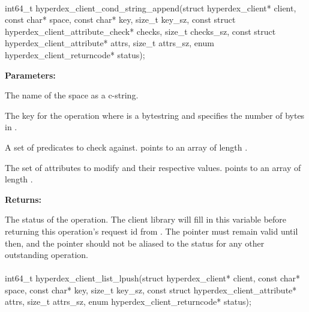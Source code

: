 \paragraph{}
\label{api:c:cond_string_append}
\begin{ccode}
int64_t hyperdex_client_cond_string_append(struct hyperdex_client* client,
        const char* space,
        const char* key, size_t key_sz,
        const struct hyperdex_client_attribute_check* checks, size_t checks_sz,
        const struct hyperdex_client_attribute* attrs, size_t attrs_sz,
        enum hyperdex_client_returncode* status);
\end{ccode}
\funcdesc 

\noindent\textbf{Parameters:}
\begin{description}[labelindent=\widthof{{\code{checks}, \code{checks\_sz}}},leftmargin=*,noitemsep,nolistsep,align=right]
\item[\code{space}] The name of the space as a c-string.
\item[\code{key}, \code{key\_sz}] The key for the operation where  is a bytestring and  specifies the number of bytes in .
\item[\code{checks}, \code{checks\_sz}] A set of predicates to check against.   points to an array of length .
\item[\code{attrs}, \code{attrs\_sz}] The set of attributes to modify and their respective values.   points to an array of length .
\end{description}

\noindent\textbf{Returns:}
\begin{description}[labelindent=\widthof{{\code{status}}},leftmargin=*,noitemsep,nolistsep,align=right]
\item[\code{status}] The status of the operation.  The client library will fill in this variable before returning this operation's request id from .  The pointer must remain valid until then, and the pointer should not be aliased to the status for any other outstanding operation.
\end{description}

\paragraph{}
\label{api:c:list_lpush}
\begin{ccode}
int64_t hyperdex_client_list_lpush(struct hyperdex_client* client,
        const char* space,
        const char* key, size_t key_sz,
        const struct hyperdex_client_attribute* attrs, size_t attrs_sz,
        enum hyperdex_client_returncode* status);
\end{ccode}
\funcdesc 

